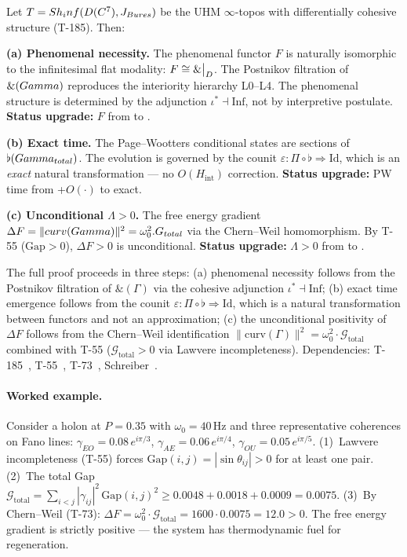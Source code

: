 \begin{theorembox}
Let $T = Sh_inf(D(C^7), J_{Bures})$ be the UHM
$\infty$-topos with differentially cohesive structure (T-185). Then:

\textbf{(a) Phenomenal necessity.} The phenomenal functor $F$ is naturally isomorphic
to the infinitesimal flat modality:
$F \cong \&\big|_{D}$.
The Postnikov filtration of $\&(Gamma)$ reproduces the interiority hierarchy L0--L4.
The phenomenal structure is determined by the adjunction $\iota^* \dashv \mathrm{Inf}$,
not by interpretive postulate. \textbf{Status upgrade:} $F$ from  to .

\textbf{(b) Exact time.} The Page--Wootters conditional states are sections of
$\flat(Gamma_{total})$. The evolution is governed by the counit
$\varepsilon: \Pi \circ \flat \Rightarrow \mathrm{Id}$, which is an \emph{exact}
natural transformation --- no $O(H_{\mathrm{int}})$ correction.
\textbf{Status upgrade:} PW time from +$O(\cdot)$ to  exact.

\textbf{(c) Unconditional $\Lambda > 0$.} The free energy gradient
$\Delta F = \|curv(Gamma)\|^2 = \omega_0^2 . G_{total}$
via the Chern--Weil homomorphism. By T-55 ($\mathrm{Gap} > 0$),
$\Delta F > 0$ is unconditional.
\textbf{Status upgrade:} $\Lambda > 0$ from  to .
\end{theorembox}

The full proof proceeds in three steps: (a) phenomenal necessity follows from
the Postnikov filtration of $\&(\Gamma)$ via the cohesive adjunction
$\iota^* \dashv \mathrm{Inf}$; (b) exact time emergence follows from the
counit $\varepsilon: \Pi \circ \flat \Rightarrow \mathrm{Id}$, which is a
natural transformation between functors and not an approximation; (c) the
unconditional positivity of $\Delta F$ follows from the Chern--Weil
identification $\|\mathrm{curv}(\Gamma)\|^2 = \omega_0^2 \cdot \mathcal{G}_\mathrm{total}$
combined with T-55 ($\mathcal{G}_\mathrm{total} > 0$ via Lawvere incompleteness).
Dependencies: T-185~, T-55~, T-73~,
Schreiber~\cite{schreiber2013}.

\paragraph{Worked example.}
Consider a holon at $P = 0.35$ with $\omega_0 = 40$\,Hz and three
representative coherences on Fano lines:
$\gamma_{EO} = 0.08\,e^{i\pi/3}$,
$\gamma_{AE} = 0.06\,e^{i\pi/4}$,
$\gamma_{OU} = 0.05\,e^{i\pi/5}$.
(1)~Lawvere incompleteness (T-55) forces
$\mathrm{Gap}(i,j) = |\sin\theta_{ij}| > 0$ for at least one pair.
(2)~The total Gap
$\mathcal{G}_{\mathrm{total}} = \sum_{i<j}|\gamma_{ij}|^2\,\mathrm{Gap}(i,j)^2
\geq 0.0048 + 0.0018 + 0.0009 = 0.0075$.
(3)~By Chern--Weil (T-73):
$\Delta F = \omega_0^2 \cdot \mathcal{G}_{\mathrm{total}}
= 1600 \cdot 0.0075 = 12.0 > 0$.
The free energy gradient is strictly positive --- the system has thermodynamic
fuel for regeneration.

